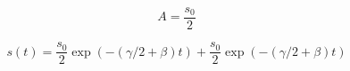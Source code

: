 \documentclass[a4paper]{article}
\begin{document}
\begin{answer}[Problema 7]
\begin{enumerate}
            $$A = \frac{s_0}{2}$$
    \end{enumerate}
    $$s(t) = \frac{s_0}{2}\exp{(-(\gamma/2 + \beta )t)}+ \frac{s_0}{2}\exp{(-(\gamma/2 + \beta )t)}$$


\end{answer}
\end{document}
